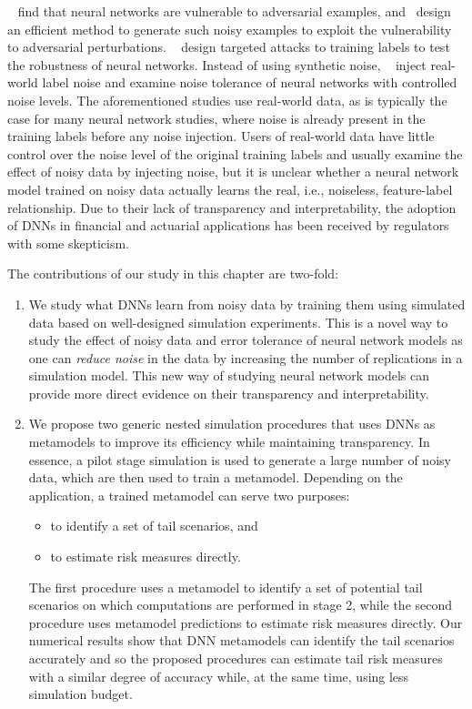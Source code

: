 ~\cite{szegedy2013intriguing} find that neural networks are vulnerable to adversarial examples, and~\cite{goodfellow2014explaining} design an efficient method to generate such noisy examples to exploit the vulnerability to adversarial perturbations.
~\cite{carlini2017towards} design targeted attacks to training labels to test the robustness of neural networks. 
Instead of using synthetic noise, ~\cite{jiang2020beyond} inject real-world label noise and examine noise tolerance of neural networks with controlled noise levels.
The aforementioned studies use real-world data, as is typically the case for many neural network studies, where noise is already present in the training labels before any noise injection.
Users of real-world data have little control over the noise level of the original training labels and usually examine the effect of noisy data by injecting noise, but it is unclear whether a neural network model trained on noisy data actually learns the real, i.e., noiseless, feature-label relationship.
Due to their lack of transparency and interpretability, the adoption of DNNs in financial and actuarial applications has been received by regulators with some skepticism.

The contributions of our study in this chapter are two-fold:
\begin{enumerate}
    \item We study what DNNs learn from noisy data by training them using simulated data based on well-designed simulation experiments.
    This is a novel way to study the effect of noisy data and error tolerance of neural network models as one can \textit{reduce noise} in the data by increasing the number of replications in a simulation model.
    This new way of studying neural network models can provide more direct evidence on their transparency and interpretability. 
    \item We propose two generic nested simulation procedures that uses DNNs as metamodels to improve its efficiency while maintaining transparency. 
    In essence, a pilot stage simulation is used to generate a large number of noisy data, which are then used to train a metamodel.
    Depending on the application, a trained metamodel can serve two purposes: 
    \begin{itemize}
        \item to identify a set of tail scenarios, and 
        \item to estimate risk measures directly.
    \end{itemize}
    The first procedure uses a metamodel to identify a set of potential tail scenarios on which computations are performed in stage 2, while the second procedure uses metamodel predictions to estimate risk measures directly.
    Our numerical results show that DNN metamodels can identify the tail scenarios accurately and so the proposed procedures can estimate tail risk measures with a similar degree of accuracy while, at the same time, using less simulation budget.
\end{enumerate}

